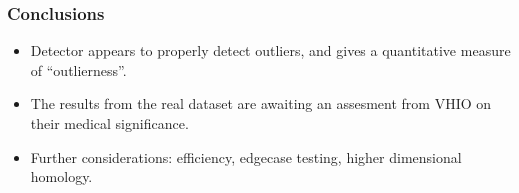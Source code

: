 \documentclass[xcolor=dvipsnames]{beamer}
\begin{document}
\begin{frame}
	\frametitle{Conclusions}
	\begin{itemize}
		\item Detector appears to properly detect outliers, and gives a quantitative measure
			of ``outlierness''. \pause
		\item The results from the real dataset are awaiting an assesment from VHIO on their
			medical significance. \pause
		\item Further considerations: efficiency, edgecase testing, higher dimensional
			homology. 
	\end{itemize}
\end{frame}
\end{document}
